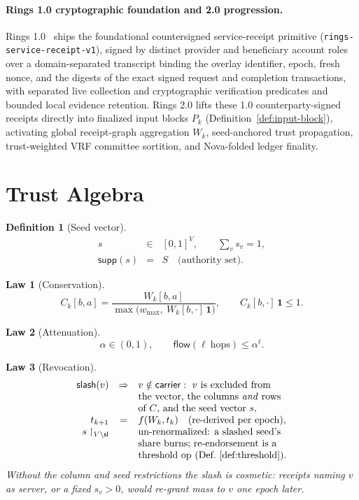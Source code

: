 \documentclass[11pt,letterpaper]{article}
\newtheorem{definition}{Definition}
\newtheorem{law}{Law}
\begin{document}
\paragraph{Rings 1.0 cryptographic foundation and 2.0 progression.}
Rings 1.0~\cite{RingsWhitepaper2026} ships the foundational countersigned
service-receipt primitive (\texttt{rings-service-receipt-v1}), signed by
distinct provider and beneficiary account roles over a domain-separated
transcript binding the overlay identifier, epoch, fresh nonce, and the digests
of the exact signed request and completion transactions, with separated live
collection and cryptographic verification predicates and bounded local evidence
retention.  Rings 2.0 lifts these 1.0 counterparty-signed receipts directly into
finalized input blocks $P_k$ (Definition~\ref{def:input-block}), activating
global receipt-graph aggregation $W_k$, seed-anchored trust propagation,
trust-weighted VRF committee sortition, and Nova-folded ledger finality.

\section{Trust Algebra}\label{sec:trust}

\begin{definition}[Seed vector]\label{def:seed}
\[
\begin{array}{rcl}
s&\in&[0,1]^{V},\qquad
\textstyle\sum_v s_v=1,\\
\mathsf{supp}(s)&=&S\quad\text{(authority set)}.
\end{array}
\]
\end{definition}

\begin{law}[Conservation]\label{law:conservation}
\[
C_k[b,a]=\frac{W_k[b,a]}{\max\bigl(w_{\max},\ W_k[b,\cdot]\,\mathbf{1}\bigr)},
\qquad
C_k[b,\cdot]\,\mathbf{1}\leq1.
\]
\end{law}

\begin{law}[Attenuation]\label{law:attenuation}
\[
\alpha\in(0,1),\qquad
\mathsf{flow}(\ell\ \text{hops})\leq\alpha^{\ell}.
\]
\end{law}

\begin{law}[Revocation]\label{law:revocation}
\[
\begin{array}{rcl}
\mathsf{slash}(v)&\Rightarrow&
  v\notin\mathsf{carrier}:\ \text{$v$ is excluded from}\\
&&\text{the vector, the columns \emph{and} rows}\\
&&\text{of $C$, and the seed vector $s$},\\
t_{k+1}&=&f(W_k,t_k)\quad\text{(re-derived per epoch)},\\
s\restriction_{V\setminus\mathsf{sl}}&&
  \text{un-renormalized: a slashed seed's}\\
&&\text{share burns; re-endorsement is a}\\
&&\text{threshold op (Def.~\ref{def:threshold})}.
\end{array}
\]
Without the column and seed restrictions the slash is cosmetic: receipts
naming $v$ as server, or a fixed $s_v>0$, would re-grant mass to $v$ one
epoch later.
\end{law}
\end{document}
